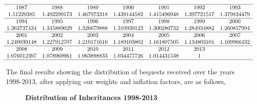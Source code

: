 \documentclass[letterpaper,12pt]{article}
\theoremstyle{definition}
\begin{document}
\begin{spacing}{1.5}
\[
\begin{matrix}
\hline
1987&  1988&  1989&  1990&  1991&  1992&  1993\\

1.51229385 & 1.492299173& 1.467973318 & 1.439144582 & 1.415496948 & 1.397721517 & 1.379834479 \\
\hline

 1994&  1995&  1996& 1997&  1998&  1999&  2000\\

1.363737434 & 1.345889029 & 1.326679888 & 1.310939123 & 1.300280732 & 1.284934882 & 1.260857994  \\
\hline
 2001&2002&  2003&  2004&  2005&  2006 &2007\\

  1.240039148 & 1.227912707 & 1.210171616 & 1.189103802 & 1.161807505 & 1.134803101& 1.109966432  \\
  \hline

    2008&  2009&  2010&  2011&  2012&  2013\\

  1.076012397 & 1.078969961 & 1.063898833 & 1.034477726 & 1.014431538 & 1\\
\hline

\end{matrix}\] 

The final results showing the distribution of bequests received over the years 1998-2013, after applying our weights and inflation factors, are as follows,\\
\begin{figure}[htbp]\centering \captionsetup{width=4.0in}
    \caption{\label{proportions}\textbf{Distribution of Inheritances 1998-2013}}
  \end{figure}



\end{spacing}
\end{document}
